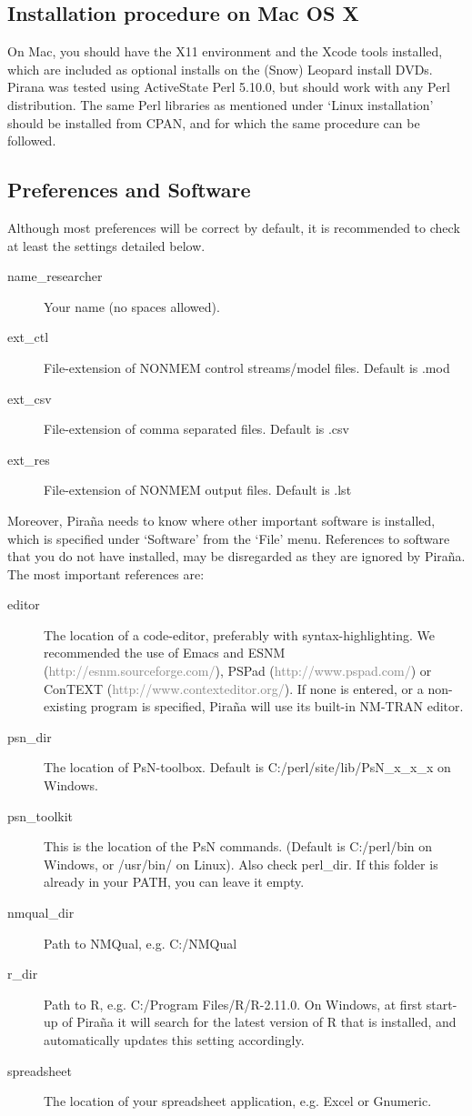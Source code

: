\documentclass[a4,11pt]{report} \usepackage[pdftex]{graphicx}
\begin{document}
\subsection{Installation procedure on Mac OS X} On Mac, you should
have the X11 environment and the Xcode tools installed, which are
included as optional installs on the (Snow) Leopard install
DVDs. Pirana was tested using ActiveState Perl 5.10.0, but should work
with any Perl distribution. The same Perl libraries as mentioned under
`Linux installation' should be installed from CPAN, and for which the same
procedure can be followed.

\subsection{Preferences and Software} Although most preferences
will be correct by default, it is recommended to check at
least the settings detailed below.
\begin{description}
  \item[name\_researcher] Your name (no spaces allowed).
  \item[ext\_ctl] File-extension of NONMEM control streams/model
files. Default is .mod
  \item[ext\_csv] File-extension of comma separated files. Default is
.csv
  \item[ext\_res] File-extension of NONMEM output files. Default is
.lst
\end{description} Moreover, Pira\~na needs to know where other
important software is installed, which is specified under `Software'
from the `File' menu. References to software that you do not have
installed, may be disregarded as they are ignored by Pira\~na. The
most important references are:
\begin{description}
\item[editor] The location of a code-editor, preferably with
  syntax-highlighting. We recommended the use of Emacs and ESNM
  (\textcolor{Grey}{http://esnm.sourceforge.com/}), PSPad
  (\textcolor{Grey}{http://www.pspad.com/}) or ConTEXT
  (\textcolor{Grey}{http://www.contexteditor.org/}). If none is
  entered, or a non-existing program is specified, Pira\~na will use
  its built-in NM-TRAN editor.
\item[psn\_dir] The location of PsN-toolbox. Default is
C:/perl/site/lib/PsN\_x\_x\_x on Windows.
\item[psn\_toolkit] This is the location of the PsN commands. (Default
is C:/perl/bin on Windows, or /usr/bin/ on Linux). Also check
perl\_dir. If this folder is already in your PATH, you can leave it empty.
\item[nmqual\_dir] Path to NMQual, e.g. C:/NMQual
\item[r\_dir] Path to R, e.g. C:/Program Files/R/R-2.11.0. On Windows,
  at first start-up of Pira\~na it will search for the latest version
  of R that is installed, and automatically updates this setting
  accordingly.
  \item[spreadsheet] The location of your spreadsheet application,
    e.g. Excel or Gnumeric.
\end{description}
\end{document}
